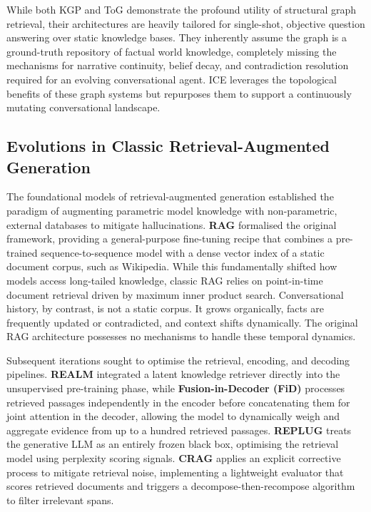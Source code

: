 \documentclass[10pt]{article}
\begin{document}
While both KGP and ToG demonstrate the profound utility of structural graph retrieval, their architectures are heavily tailored for single-shot, objective question answering over static knowledge bases. They inherently assume the graph is a ground-truth repository of factual world knowledge, completely missing the mechanisms for narrative continuity, belief decay, and contradiction resolution required for an evolving conversational agent. ICE leverages the topological benefits of these graph systems but repurposes them to support a continuously mutating conversational landscape.

\subsection{Evolutions in Classic Retrieval-Augmented Generation}

The foundational models of retrieval-augmented generation established the paradigm of augmenting parametric model knowledge with non-parametric, external databases to mitigate hallucinations. \textbf{RAG} \citep{lewis2020rag} formalised the original framework, providing a general-purpose fine-tuning recipe that combines a pre-trained sequence-to-sequence model with a dense vector index of a static document corpus, such as Wikipedia. While this fundamentally shifted how models access long-tailed knowledge, classic RAG relies on point-in-time document retrieval driven by maximum inner product search. Conversational history, by contrast, is not a static corpus. It grows organically, facts are frequently updated or contradicted, and context shifts dynamically. The original RAG architecture possesses no mechanisms to handle these temporal dynamics.

Subsequent iterations sought to optimise the retrieval, encoding, and decoding pipelines. \textbf{REALM} \citep{guu2020realm} integrated a latent knowledge retriever directly into the unsupervised pre-training phase, while \textbf{Fusion-in-Decoder (FiD)} \citep{izacard2021fid} processes retrieved passages independently in the encoder before concatenating them for joint attention in the decoder, allowing the model to dynamically weigh and aggregate evidence from up to a hundred retrieved passages. \textbf{REPLUG} \citep{shi2024replug} treats the generative LLM as an entirely frozen black box, optimising the retrieval model using perplexity scoring signals. \textbf{CRAG} \citep{yan2024crag} applies an explicit corrective process to mitigate retrieval noise, implementing a lightweight evaluator that scores retrieved documents and triggers a decompose-then-recompose algorithm to filter irrelevant spans.
\end{document}

